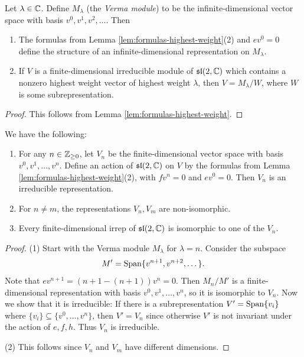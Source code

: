 \begin{lemma}
  Let $\lambda \in \mathbb{C}$. Define
  $M_\lambda$ (the \emph{Verma module})
  to be the infinite-dimensional vector space
  with basis $v^0, v^1, v^2, \dots$. Then
  \begin{enumerate}
    \item The formulas from
      Lemma \ref{lem:formulas-highest-weight}(2)
      and $ev^0 = 0$ define the structure of
      an infinite-dimensional representation
      on $M_\lambda$.
    \item If $V$ is a finite-dimensional
      irreducible module of $\mathfrak{sl}(2, \mathbb{C})$
      which contains a nonzero highest
      weight vector of highest weight
      $\lambda$, then $V = M_\lambda / W$,
      where $W$ is some subrepresentation.
  \end{enumerate}
\end{lemma}

\begin{proof}
  This follows from Lemma
  \ref{lem:formulas-highest-weight}.
\end{proof}

\begin{theorem}
  We have the following:
  \begin{enumerate}
    \item For any $n \in \mathbb{Z}_{\ge 0}$, let
      $V_n$ be the finite-dimensional
      vector space with basis
      $v^0, v^1, \dots, v^n$. Define an
      action of $\mathfrak{sl}(2, \mathbb{C})$ on
      $V$ by the formulas from
      Lemma \ref{lem:formulas-highest-weight}(2),
      with $f v^n = 0$ and $ev^0 = 0$.
      Then $V_n$ is an irreducible
      representation.
    \item For $n \ne m$, the representations
      $V_n, V_m$ are non-isomorphic.
    \item Every finite-dimensional irrep
      of $\mathfrak{sl}(2, \mathbb{C})$ is
      isomorphic to one of the
      $V_n$.
  \end{enumerate}
\end{theorem}

\begin{proof}
  (1) Start with the Verma module $M_\lambda$
  for $\lambda = n$. Consider
  the subspace
  \[
    M' = \operatorname{Span}\{v^{n + 1}, v^{n + 2}, \dots\}.
  \]
  Note that $ev^{n + 1} = (n + 1 - (n + 1))v^n = 0$.
  Then $M_n / M'$ is a finite-dimensional
  representation with basis
  $v^0, v^1, \dots, v^n$, so it is
  isomorphic to $V_n$. Now we show that
  it is irreducible: If there is a
  subrepresentation $V' = \operatorname{Span}\{v_i\}$
  where $\{v_i\} \subseteq \{v^0, \dots, v^n\}$,
  then $V' = V_n$ since otherwise
  $V'$ is not invariant under the action of
  $e, f, h$. Thus
  $V_n$ is irreducible.

  (2) This follows since $V_n$ and
  $V_m$ have different dimensions.
\end{proof}

